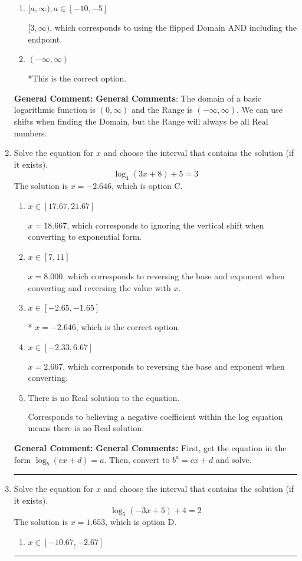 \documentclass{extbook}[14pt]
\newcommand{\litem}[1]{\item #1

\rule{\textwidth}{0.4pt}}
\begin{document}
\begin{enumerate}
{\begin{enumerate}[label=\Alph*.]
$(-\infty, 3)$, which corresponds to using the vertical shift while the Range is $(-\infty, \infty)$.
\item \( [a, \infty), a \in [-10, -5] \)

$[3, \infty)$, which corresponds to using the flipped Domain AND including the endpoint.
\item \( (-\infty, \infty) \)

*This is the correct option.
\end{enumerate}

\textbf{General Comment:} \textbf{General Comments}: The domain of a basic logarithmic function is $(0, \infty)$ and the Range is $(-\infty, \infty)$. We can use shifts when finding the Domain, but the Range will always be all Real numbers.
}
\litem{
Solve the equation for $x$ and choose the interval that contains the solution (if it exists).
\[ \log_{4}{(3x+8)}+5 = 3 \]
The solution is \( x = -2.646 \), which is option C.\begin{enumerate}[label=\Alph*.]
\item \( x \in [17.67, 21.67] \)

$x = 18.667$, which corresponds to ignoring the vertical shift when converting to exponential form.
\item \( x \in [7, 11] \)

$x = 8.000$, which corresponds to reversing the base and exponent when converting and reversing the value with $x$.
\item \( x \in [-2.65, -1.65] \)

* $x = -2.646$, which is the correct option.
\item \( x \in [-2.33, 6.67] \)

$x = 2.667$, which corresponds to reversing the base and exponent when converting.
\item \( \text{There is no Real solution to the equation.} \)

Corresponds to believing a negative coefficient within the log equation means there is no Real solution.
\end{enumerate}

\textbf{General Comment:} \textbf{General Comments:} First, get the equation in the form $\log_b{(cx+d)} = a$. Then, convert to $b^a = cx+d$ and solve.
}
\litem{
Solve the equation for $x$ and choose the interval that contains the solution (if it exists).
\[ \log_{5}{(-3x+5)}+4 = 2 \]
The solution is \( x = 1.653 \), which is option D.\begin{enumerate}[label=\Alph*.]
\item \( x \in [-10.67, -2.67] \)


\end{enumerate}}
\end{enumerate}
\end{document}
